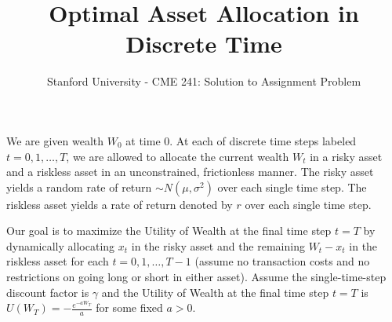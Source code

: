 \documentclass[12pt]{amsart}
\title{Optimal Asset Allocation in Discrete Time}
\author{Stanford University - CME 241: Solution to Assignment Problem}
\date{} %
\begin{document}
\maketitle

We are given wealth $W_0$ at time 0. At each of discrete time steps labeled $t = 0, 1, \ldots, T$, we are allowed to allocate the current wealth $W_t$ in a risky asset and a riskless asset in an unconstrained, frictionless manner. The risky asset yields a random rate of return $\sim N(\mu, \sigma^2)$ over each single time step. The riskless asset yields a rate of return denoted by $r$ over each single time step.

Our goal is to maximize the Utility of Wealth at the final time step $t=T$ by dynamically allocating $x_t$ in the risky asset and the remaining $W_t - x_t$ in the riskless asset for each $t = 0, 1, \ldots, T-1$ (assume no transaction costs and no restrictions on going long or short in either asset). Assume the single-time-step discount factor is $\gamma$ and the Utility of Wealth at the final time step $t=T$ is $U(W_T) = - \frac {e^{-a W_T}} {a}$ for some fixed $a > 0$.
\end{document}
